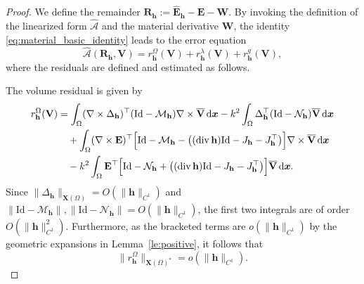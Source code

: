 \documentclass[10pt,a4paper]{amsart}
\numberwithin{equation}{section}
\begin{document}
\begin{proof}
We define the remainder $\mathbf{R}_{\mathbf{h}} := \hat{\mathbf{E}}_{\mathbf{h}} - \mathbf{E} - \mathbf{W}$. By invoking the definition of the linearized form $\widehat{\mathcal{A}}$ and the material derivative $\mathbf{W}$, the identity \eqref{eq:material_basic_identity} leads to the error equation
\[
\widehat{\mathcal{A}}(\mathbf{R}_{\mathbf{h}}, \mathbf{V}) = r_{\mathbf{h}}^{\Omega}(\mathbf{V}) + r_{\mathbf{h}}^{\lambda}(\mathbf{V}) + r_{\mathbf{h}}^{g}(\mathbf{V}),
\]
where the residuals are defined and estimated as follows.


The volume residual is given by
\[
\begin{aligned}
r_{\mathbf{h}}^{\Omega}(\mathbf{V}) &= \int_\Omega (\nabla \times \Delta_{\mathbf{h}})^\top (\mathrm{Id} - \mathcal{M}_{\mathbf{h}}) \nabla \times \overline{\mathbf{V}} \,\mathrm{d}\boldsymbol{x} - k^2 \int_\Omega \Delta_{\mathbf{h}}^\top (\mathrm{Id} - \mathcal{N}_{\mathbf{h}}) \overline{\mathbf{V}} \,\mathrm{d}\boldsymbol{x} \\
&\quad + \int_\Omega (\nabla \times \mathbf{E})^\top \Bigl[ \mathrm{Id} - \mathcal{M}_{\mathbf{h}} - \bigl( (\operatorname{div}\mathbf{h})\mathrm{Id} - J_{\mathbf{h}} - J_{\mathbf{h}}^\top \bigr) \Bigr] \nabla \times \overline{\mathbf{V}} \,\mathrm{d}\boldsymbol{x} \\
&\quad - k^2 \int_\Omega \mathbf{E}^\top \Bigl[ \mathrm{Id} - \mathcal{N}_{\mathbf{h}} + \bigl( (\operatorname{div}\mathbf{h})\mathrm{Id} - J_{\mathbf{h}} - J_{\mathbf{h}}^\top \bigr) \Bigr] \overline{\mathbf{V}} \,\mathrm{d}\boldsymbol{x}.
\end{aligned}
\]
Since $\|\Delta_{\mathbf{h}}\|_{\mathbf{X}(\Omega)} = O(\|\mathbf{h}\|_{C^1})$ and $\|\mathrm{Id} - \mathcal{M}_{\mathbf{h}}\|, \|\mathrm{Id} - \mathcal{N}_{\mathbf{h}}\| = O(\|\mathbf{h}\|_{C^1})$, the first two integrals are of order $O(\|\mathbf{h}\|_{C^1}^2)$. Furthermore, as the bracketed terms are $o(\|\mathbf{h}\|_{C^1})$ by the geometric expansions in Lemma~\ref{le:positive}, it follows that
\[
\|r_{\mathbf{h}}^{\Omega}\|_{\mathbf{X}(\Omega)^*} = o(\|\mathbf{h}\|_{C^1}).
\]


\end{proof}
\end{document}
